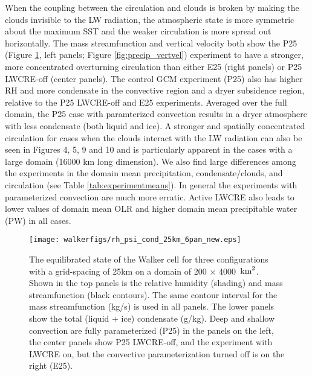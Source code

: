 \documentclass[draft]{agujournal2019}
\begin{document}
When the coupling between the circulation and clouds is broken by making the clouds invisible to the 
LW radiation, the atmospheric state is more symmetric about the maximum SST and the weaker circulation
is more spread out horizontally.   The mass streamfunction and vertical velocity both show the 
P25 (Figure \ref{fig:rh_psi_P25vsE25}, left panels; Figure \ref{fig:precip_vertvel}) experiment to have 
a stronger, more concentrated overturning circulation than either E25 (right panels) or P25 LWCRE-off (center panels).   
The control GCM experiment (P25) also has higher RH and more condensate in the convective
region and a dryer subsidence region, relative to the P25 LWCRE-off and E25 experiments. 
Averaged over the full domain, the P25 case with paramterized convection results in a 
dryer atmosphere with less condensate (both liquid and ice). 
A stronger and spatially concentrated circulation for cases when the clouds interact with the LW 
radiation can also be seen in Figures 4, 5, 9 and 10 and is particularly apparent in 
the cases with a large domain (16000 km long dimension).   
We also find large differences among the experiments in the domain mean precipitation, condensate/clouds, 
and circulation (see Table \ref{tab:experimentmeans}).  In general the experiments with parameterized convection are much more erratic. 
Active LWCRE also leads to lower
values of domain mean OLR and higher domain mean precipitable water (PW) in all cases. 

%


\begin{figure}
  \centering
      \texttt{[image: walkerfigs/rh\_psi\_cond\_25km\_6pan\_new.eps]}
      \caption{The equilibrated state of the Walker cell for three configurations with a grid-spacing of 25km on a domain of 200 $\times$ 4000 $\, \rm{km}^2$.
      Shown in the top panels is the relative humidity (shading) and mass streamfunction (black contours).
      The same contour interval for the mass 
      streamfunction (kg/s) is used in all panels.
      The lower panels show the total (liquid + ice) condensate (g/kg).  
      Deep and shallow convection are fully parameterized (P25) in the panels on the left, the center panels show P25 LWCRE-off, 
      and the experiment with LWCRE on, but the convective
      parameterization turned off is on the right (E25).}
  \label{fig:rh_psi_P25vsE25}
\end{figure}
\end{document}
